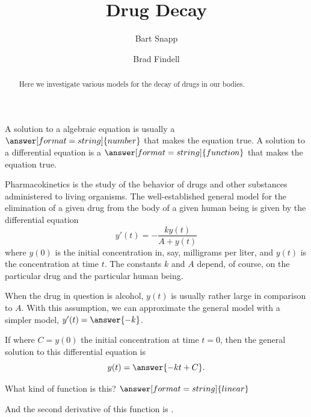 \documentclass{ximera}
\title{Drug Decay}
\author{Bart Snapp \and Brad Findell}
\begin{document}
\begin{abstract}
Here we investigate various models for the decay of drugs in our bodies.  
\end{abstract}
\maketitle

\begin{question}
A solution to a algebraic equation is usually a $\answer[format=string]{number}$ that makes the equation true.  A solution to a differential equation is a $\answer[format=string]{function}$ that makes the equation true.  
\end{question}

Pharmacokinetics is the study of the behavior of drugs and other substances administered to living organisms.  
The well-established general model for 
the elimination of a given drug from the body of a given human being is given by the differential equation 
$$y'(t)=-\frac{ky(t)}{A+y(t)}$$
where $y(0)$ is the initial concentration in, say, milligrams per liter, and $y(t)$ is the concentration at time $t$.  The constants $k$ and $A$ depend, of course, on the particular drug and the particular human being. 


\begin{question}
When the drug in question is alcohol, $y(t)$ is usually rather large in comparison to $A$.   With this assumption, we can approximate the general model with a simpler model, $y'(t)=\answer{-k}$.    

If where $C=y(0)$ the initial concentration at time $t=0$, then the general solution to this differential equation is 
\[  
y(t) =\answer{ -kt + C}.  
\]

What kind of function is this? $\answer[format=string]{linear}$

And the second derivative of this function is .  
\end{question}
\end{document}

